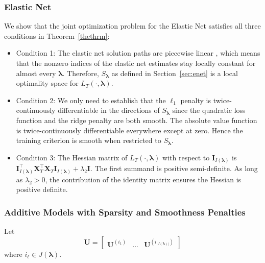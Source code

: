 \documentclass[12pt,letterpaper]{article}
\begin{document}
\subsubsection{Elastic Net}\label{enet_conditions}
We show that the joint optimization problem for the Elastic Net satisfies all three conditions in Theorem~\ref{thethrm}:
\begin{itemize}
\item[] Condition 1: The elastic net solution paths are piecewise linear \citep{zou2003regression}, which means that the nonzero indices of the elastic net estimates stay locally constant for almost every $\boldsymbol{\lambda}$. Therefore, $S_{\boldsymbol{\lambda}}$ as defined in Section~\ref{sec:enet}  is a local optimality space for $L_T(\cdot, \boldsymbol{\lambda})$. \hfill {}
\item[] Condition 2: We only need to establish that the $\ell_1$ penalty is twice-continuously differentiable in the directions of $S_{\boldsymbol{\lambda}}$ since the quadratic loss function and the ridge penalty are both smooth. The absolute value function is twice-continuously differentiable everywhere except at zero. Hence the training criterion is smooth when restricted to $S_{\boldsymbol{\lambda}}$. \hfill {}
\item[] Condition 3: The Hessian matrix of $L_T(\cdot, \boldsymbol{\lambda})$ with respect to $\boldsymbol I_{I(\boldsymbol \lambda)}$ is $\boldsymbol I_{I(\boldsymbol \lambda)}^\top \boldsymbol{X}_{T}^\top \boldsymbol{X}_{T} \boldsymbol I_{I(\boldsymbol \lambda)} + \lambda_2 \boldsymbol{I}$. The first summand is positive semi-definite. As long as $\lambda_2 > 0$, the contribution of the identity matrix ensures the Hessian is positive definite. \hfill {}
\end{itemize}

\subsubsection{Additive Models with Sparsity and Smoothness Penalties}
\label{sec_appendix:sparse_add_models}
Let 
\begin{equation}
\boldsymbol{U} = \begin{bmatrix}
\boldsymbol {U}^{(i_1)} & ... & \boldsymbol {U}^{(i_{|J(\boldsymbol \lambda)|})}
\end{bmatrix}
\end{equation}
where $i_\ell \in J(\boldsymbol \lambda)$.
\end{document}
